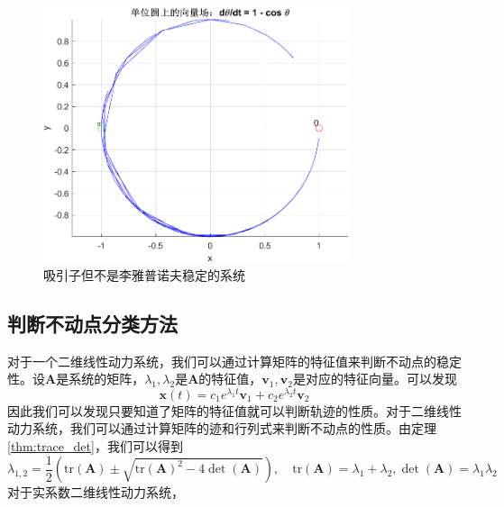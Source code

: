 \begin{figure}[H]
    \centering
    \includegraphics[width=0.8\textwidth]{Img/fix1.png}
    \caption{吸引子但不是李雅普诺夫稳定的系统}
    \label{fig:attractor}
\end{figure}
\subsection{判断不动点分类方法}
对于一个二维线性动力系统，我们可以通过计算矩阵的特征值来判断不动点的稳定性。设$\mathbf{A}$是系统的矩阵，$\lambda_1,\lambda_2$是$\mathbf{A}$的特征值，$\mathbf{v}_1,\mathbf{v}_2$是对应的特征向量。可以发现
\begin{equation}
    \mathbf{x}(t)=c_1e^{\lambda_1t}\mathbf{v}_1+c_2e^{\lambda_2t}\mathbf{v}_2
\end{equation}
因此我们可以发现只要知道了矩阵的特征值就可以判断轨迹的性质。对于二维线性动力系统，我们可以通过计算矩阵的迹和行列式来判断不动点的性质。由定理\ref{thm:trace_det}，我们可以得到
\begin{equation}
    \lambda_{1,2}=\frac{1}{2}\left(\text{tr}(\mathbf{A})\pm \sqrt{\text{tr}(\mathbf{A})^2-4\det(\mathbf{A})}\right),\quad \text{tr}(\mathbf{A})=\lambda_1+\lambda_2,\det(\mathbf{A})=\lambda_1\lambda_2
\end{equation}
对于实系数二维线性动力系统，

